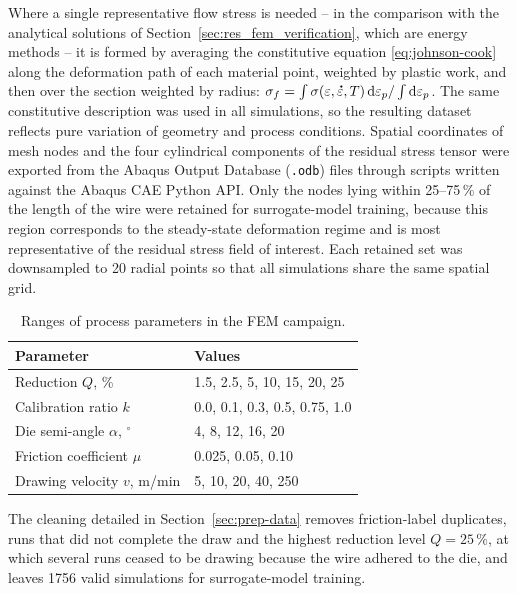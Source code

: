 \documentclass[pdflatex,sn-basic,Numbered]{sn-jnl}
\newcommand{\edot}{\accentset{\scalebox{0.4}{$\bullet$}}{\varepsilon}}
\begin{document}
Where a single representative flow stress is needed -- in the comparison with the analytical
solutions of Section~\ref{sec:res_fem_verification}, which are energy methods -- it is formed
by averaging the constitutive equation \eqref{eq:johnson-cook} along the deformation path of
each material point, weighted by plastic work, and then over the section weighted by radius:
$\sigma_f = \int\sigma(\varepsilon,\edot,T)\,\mathrm{d}\varepsilon_p /
\int\mathrm{d}\varepsilon_p$.
The same constitutive description was used in all simulations, so the resulting dataset reflects pure variation of geometry and process conditions. Spatial coordinates of mesh nodes and the four cylindrical components of the residual stress tensor were exported from the Abaqus Output Database (\texttt{.odb}) files through scripts written against the Abaqus CAE Python API. Only the nodes lying within 25--75\,\% of the length of the wire were retained for surrogate-model training, because this region corresponds to the steady-state deformation regime and is most representative of the residual stress field of interest. Each retained set was downsampled to 20 radial points so that all simulations share the same spatial grid.



\begin{table}[!h]
\centering
\caption{Ranges of process parameters in the FEM campaign.}
\label{tab:fem_params}

\begin{tabularx}{\columnwidth}{@{}lX@{}}
\toprule
Parameter & Values \\
\midrule
Reduction $Q$, \% & 1.5, 2.5, 5, 10, 15, 20, 25 \\
Calibration ratio $k$ & 0.0, 0.1, 0.3, 0.5, 0.75, 1.0 \\
Die semi-angle $\alpha$, $^{\circ}$ & 4, 8, 12, 16, 20 \\
Friction coefficient $\mu$ & 0.025, 0.05, 0.10 \\
Drawing velocity $v$, m/min & 5, 10, 20, 40, 250 \\
\bottomrule
\end{tabularx}
\end{table}

The cleaning detailed in Section~\ref{sec:prep-data} removes friction-label duplicates, runs that did not complete the draw and the highest reduction level $Q=25\,\%$, at which several runs ceased to be drawing because the wire adhered to the die, and leaves 1756 valid simulations for surrogate-model training.
\end{document}
